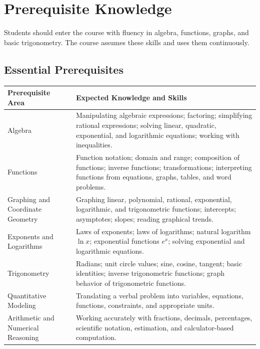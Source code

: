 \documentclass[11pt]{article}
\begin{document}
\section{Prerequisite Knowledge}

Students should enter the course with fluency in algebra, functions, graphs, and basic trigonometry. The course assumes these skills and uses them continuously.

\subsection{Essential Prerequisites}

\begin{longtable}{p{} p{}}
\toprule
\textbf{Prerequisite Area} & \textbf{Expected Knowledge and Skills} \\
\midrule
\endhead

Algebra &
Manipulating algebraic expressions; factoring; simplifying rational expressions; solving linear, quadratic, exponential, and logarithmic equations; working with inequalities. \\

Functions &
Function notation; domain and range; composition of functions; inverse functions; transformations; interpreting functions from equations, graphs, tables, and word problems. \\

Graphing and Coordinate Geometry &
Graphing linear, polynomial, rational, exponential, logarithmic, and trigonometric functions; intercepts; asymptotes; slopes; reading graphical trends. \\

Exponents and Logarithms &
Laws of exponents; laws of logarithms; natural logarithm $\ln x$; exponential functions $e^x$; solving exponential and logarithmic equations. \\

Trigonometry &
Radians; unit circle values; sine, cosine, tangent; basic identities; inverse trigonometric functions; graph behavior of trigonometric functions. \\

Quantitative Modeling &
Translating a verbal problem into variables, equations, functions, constraints, and appropriate units. \\

Arithmetic and Numerical Reasoning &
Working accurately with fractions, decimals, percentages, scientific notation, estimation, and calculator-based computation. \\
\bottomrule
\end{longtable}
\end{document}

